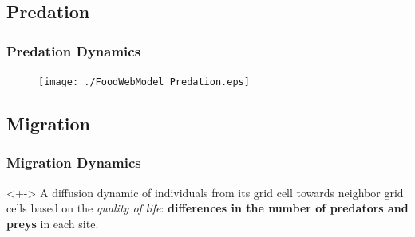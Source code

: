 \documentclass[xcolor=x11names,compress]{beamer}
\renewcommand{\(}{\begin{columns}}
\renewcommand{\)}{\end{columns}}
\newcommand{\<}[1]{\begin{column}{#1}}
\renewcommand{\>}{\end{column}}
\begin{document}

\subsection{Predation}

\begin{frame}
\frametitle{Predation Dynamics}
\begin{figure}
\texttt{[image: ./FoodWebModel\_Predation.eps]}
\end{figure}
\end{frame}


\subsection{Migration}

\begin{frame}
\frametitle{Migration Dynamics}
\begin{block}<+->{}
A diffusion dynamic of individuals from its grid cell towards neighbor grid cells based on the \emph{quality of life}: \textbf{differences in the number of predators and preys} in each site. 
\end{block} 
\end{frame}
\end{document}
